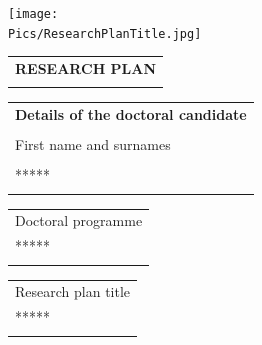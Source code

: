 \thispagestyle{empty} %

\vspace*{-2truecm}

\newlength{\HeadWidth}
\setlength{\HeadWidth}{\textwidth}

\newlength{\LogoWidthL}
\addtolength{\HeadWidth}{-\LogoWidthL}
\addtolength{\HeadWidth}{-3mm} %

\newlength{\BoxBreite}
\setlength{\BoxBreite}{\textwidth}

\vspace*{-1.5cm}
{
  \parbox[b]{\BoxBreite}
  {                               
    \texttt{[image: \\Pics/ResearchPlanTitle.jpg]}
  }
}       
\vspace{1.35cm}

\begin{tabularx}{\textwidth}{l}
  \textbf{RESEARCH PLAN} \\
\Xhline{1.5pt} 
\end{tabularx}

\vspace {0.5cm}

\begin{tabularx}{\textwidth}{l}
\textbf{Details of the doctoral candidate} \\
\Xhline{1.2pt} \\
\small{First name and surnames} \\ \\
\large{*****} \\
\Xhline{1\arrayrulewidth}
\end{tabularx}

\begin{tabularx}{\textwidth}{l}
\small{Doctoral programme} \\
\large{*****} \\
\Xhline{1\arrayrulewidth}
\end{tabularx}

\begin{tabularx}{\textwidth}{l}
\small{Research plan title} \\
\large{***** } \\ 
\Xhline{1\arrayrulewidth}
\end{tabularx}

